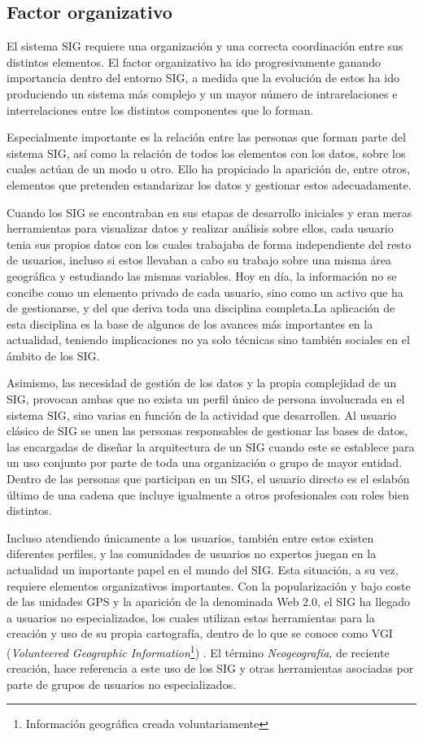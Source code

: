 \subsection{Factor organizativo}

El sistema SIG requiere una organización y una correcta coordinación entre sus distintos elementos. El factor organizativo ha ido progresivamente ganando importancia dentro del entorno SIG, a medida que la evolución de estos ha ido produciendo un sistema más complejo y un mayor número de intrarelaciones e interrelaciones entre los distintos componentes que lo forman.

Especialmente importante es la relación entre las personas que forman parte del sistema SIG, así como la relación de todos los elementos con los datos, sobre los cuales actúan de un modo u otro. Ello ha propiciado la aparición de, entre otros, elementos que pretenden estandarizar los datos y gestionar estos adecuadamente.

Cuando los SIG se encontraban en sus etapas de desarrollo iniciales y eran meras herramientas para visualizar datos y realizar análisis sobre ellos, cada usuario tenia sus propios datos con los cuales trabajaba de forma independiente del resto de usuarios, incluso si estos llevaban a cabo su trabajo sobre una misma área geográfica y estudiando las mismas variables. Hoy en día, la información no se concibe como un elemento privado de cada usuario, sino como un activo que ha de gestionarse, y del que deriva toda una disciplina completa.La aplicación de esta disciplina es la base de algunos de los avances más importantes en la actualidad, teniendo implicaciones no ya solo técnicas sino también sociales en el ámbito de los SIG.

Asimismo, las necesidad de gestión de los datos y la propia complejidad de un SIG, provocan ambas que no exista un perfil único de persona involucrada en el sistema SIG, sino varias en función de la actividad que desarrollen. Al usuario clásico de SIG se unen las personas responsables de gestionar las bases de datos, las encargadas de diseñar la arquitectura de un SIG cuando este se establece para un uso conjunto por parte de toda una organización o grupo de mayor entidad. Dentro de las personas que participan en un SIG, el usuario directo es el eslabón último de una cadena que incluye igualmente a otros profesionales con roles bien distintos.

Incluso atendiendo únicamente a los usuarios, también entre estos existen diferentes perfiles, y las comunidades de usuarios no expertos juegan en la actualidad un importante papel en el mundo del SIG. Esta situación, a su vez, requiere elementos organizativos importantes. Con la popularización y bajo coste de las unidades GPS y la aparición de la denominada Web 2.0, el SIG ha llegado a usuarios no especializados, los cuales utilizan estas herramientas para la creación y uso de su propia cartografía, dentro de lo que se conoce como VGI (\emph{Volunteered Geographic Information}\footnote{Información geográfica creada voluntariamente}) \cite{goodchildVGI}. El término \emph{Neogeografía}, de reciente creación, hace referencia a este uso de los SIG y otras herramientas asociadas por parte de grupos de usuarios no especializados.

